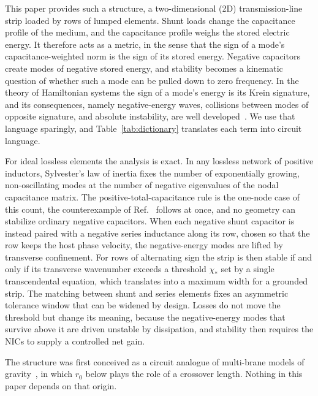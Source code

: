 \documentclass[aps,prapplied,twocolumn,superscriptaddress,floatfix,longbibliography]{revtex4-2}
\begin{document}
This paper provides such a structure, a two-dimensional (2D) transmission-line strip loaded by rows of lumped elements. Shunt loads change the capacitance profile of the medium, and the capacitance profile weighs the stored electric energy. It therefore acts as a metric, in the sense that the sign of a mode's capacitance-weighted norm is the sign of its stored energy. Negative capacitors create modes of negative stored energy, and stability becomes a kinematic question of whether such a mode can be pulled down to zero frequency. In the theory of Hamiltonian systems the sign of a mode's energy is its Krein signature, and its consequences, namely negative-energy waves, collisions between modes of opposite signature, and absolute instability, are well developed~\cite{Kapitula_2013:book,Kollar_2014:SIREV,Cairns_1979:JFM,Briggs_1964:book}. We use that language sparingly, and Table~\ref{tab:dictionary} translates each term into circuit language.

For ideal lossless elements the analysis is exact. In any lossless network of positive inductors, Sylvester's law of inertia fixes the number of exponentially growing, non-oscillating modes at the number of negative eigenvalues of the nodal capacitance matrix. The positive-total-capacitance rule is the one-node case of this count, the counterexample of Ref.~\cite{Loncar_2017:TAP} follows at once, and no geometry can stabilize ordinary negative capacitors. When each negative shunt capacitor is instead paired with a negative series inductance along its row, chosen so that the row keeps the host phase velocity, the negative-energy modes are lifted by transverse confinement. For rows of alternating sign the strip is then stable if and only if its transverse wavenumber exceeds a threshold $\chi_*$ set by a single transcendental equation, which translates into a maximum width for a grounded strip. The matching between shunt and series elements fixes an asymmetric tolerance window that can be widened by design. Losses do not move the threshold but change its meaning, because the negative-energy modes that survive above it are driven unstable by dissipation, and stability then requires the NICs to supply a controlled net gain.

The structure was first conceived as a circuit analogue of multi-brane models of gravity~\cite{Dvali_2000:PLB,Dai_2014:PRD}, in which $r_0$ below plays the role of a crossover length. Nothing in this paper depends on that origin.
\end{document}
